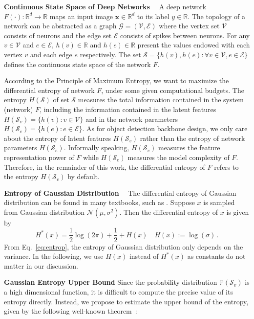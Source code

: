 \documentclass[nohyperref]{article}
\theoremstyle{plain}
\theoremstyle{definition}
\theoremstyle{remark}
\begin{document}
\noindent\textbf{Continuous State Space of Deep Networks}$\quad$ 
A deep network $F(\cdot): \mathbb{R}^{d} \xrightarrow{} \mathbb{R}$ maps an input image $\boldsymbol{x}\in \mathbb{R}^d$ to its label $y \in \mathbb{R}$. The topology of a network can be abstracted as a graph $\mathcal{G}=(\mathcal{V}, \mathcal{E})$ where the vertex set $\mathcal{V}$ consists of neurons and the edge set $\mathcal{E}$ consists of spikes between neurons. For any $v \in \mathcal{V}$ and $e \in \mathcal{E}$, $h(v) \in \mathbb{R}$ and $h(e)\in \mathbb{R}$ present the values endowed with each vertex $v$ and each edge $e$ respectively. The set $\mathcal{S} = \{ h(v),h(e): \forall v\in \mathcal{V}, e \in \mathcal{E}\}$ defines the continuous state space of the network $F$.

According to the Principle of Maximum Entropy, we want to maximize the differential entropy of network $F$, under some given computational budgets. The entropy $H(\mathcal{S})$ of set $\mathcal{S}$ measures the total information contained in the system (network) $F$, including the information contained in the latent features $H(\mathcal{S}_v) = \{h(v): v \in \mathcal{V}\}$ and in the network parameters  $H(\mathcal{S}_e) = \{h(e): e \in \mathcal{E}\}$. As for object detection backbone design, we only care about the entropy of latent features $H(\mathcal{S}_v)$ rather than the entropy of network parameters $H(\mathcal{S}_e)$. Informally speaking, $H(\mathcal{S}_v)$ measures the feature representation power of $F$ while $H(\mathcal{S}_e)$ measures the model complexity of $F$.  Therefore, in the remainder of this work, the differential entropy of $F$ refers to the entropy $H(\mathcal{S}_v)$ by default.

\noindent\textbf{Entropy of Gaussian Distribution}$\quad$
The differential entropy of Gaussian distribution can be found in many textbooks, such as \citep{entropy}.
Suppose $x$ is sampled from Gaussian distribution $\mathcal{N}(\mu,\sigma^2)$. Then the differential entropy of $x$ is given by
\begin{equation}
	\label{eq:entrop}
H^*(x) =\frac{1}{2}\log(2\pi) + \frac{1}{2} + H(x) \quad H(x):=\log(\sigma)\,.
\end{equation}
From Eq.~\ref{eq:entrop}, the entropy of Gaussian distribution only depends on the variance. In the following, we use $H(x)$ instead of $H^*(x)$ as constants do not matter in our discussion.


\noindent\textbf{Gaussian Entropy Upper Bound} Since the probability distribution $\mathbb{P}(\mathcal{S}_v)$ is a high dimensional function, it is difficult to compute the precise value of its entropy directly. Instead, we propose to estimate the upper bound of the entropy, given by the following well-known theorem~\citep{coverElementsInformationTheory2012}:
\end{document}

